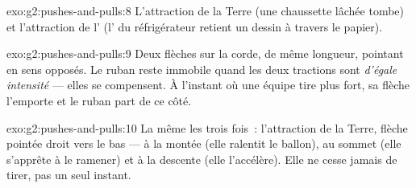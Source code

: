 \begin{solution}{exo:g2:pushes-and-pulls:8}
L'attraction de la Terre (une chaussette lâchée tombe) et
l'attraction de l' (l' du réfrigérateur retient un dessin
à travers le papier).
\end{solution}

\begin{solution}{exo:g2:pushes-and-pulls:9}
Deux flèches sur la corde, de même longueur, pointant en sens
opposés. Le ruban reste immobile quand les deux tractions sont
\emph{d'égale intensité} --- elles se compensent. À l'instant où une
équipe tire plus fort, sa flèche l'emporte et le ruban part de ce
côté.
\end{solution}

\begin{solution}{exo:g2:pushes-and-pulls:10}
La même  les trois fois~: l'attraction de la Terre, flèche
pointée droit vers le bas --- à la montée (elle ralentit le ballon),
au sommet (elle s'apprête à le ramener) et à la descente (elle
l'accélère). Elle ne cesse jamais de tirer, pas un seul instant.
\end{solution}
